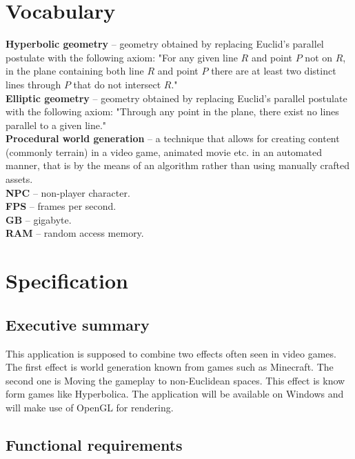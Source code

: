 \documentclass[12pt]{article}
\begin{document}
\section{Vocabulary} %
\textbf{Hyperbolic geometry} -- geometry obtained by replacing Euclid's parallel postulate with the following axiom: "For any given line $R$ and point $P$ not on $R$, in the plane containing both line $R$ and point $P$ there are at least two distinct lines through $P$ that do not intersect $R$." \\
\textbf{Elliptic geometry} -- geometry obtained by replacing Euclid's parallel postulate with the following axiom: "Through any point in the plane, there exist no lines parallel to a given line."\\
\textbf{Procedural world generation} -- a technique that allows for creating content (commonly terrain) in a video game, animated movie etc. in an automated manner, that is by the means of an algorithm rather than using manually crafted assets.\\
\textbf{NPC} -- non-player character.\\
\textbf{FPS} -- frames per second.\\
\textbf{GB} -- gigabyte.\\
\textbf{RAM} -- random access memory.\\


\section{Specification} %

\subsection{Executive summary}

This application is supposed to combine two effects often seen in video games. The first effect is world generation known from games such as Minecraft. The second one is Moving the gameplay to non-Euclidean spaces. This effect is know form games like Hyperbolica. The application will be available on Windows and will make use of OpenGL for rendering.

\subsection{Functional requirements}
\end{document}
